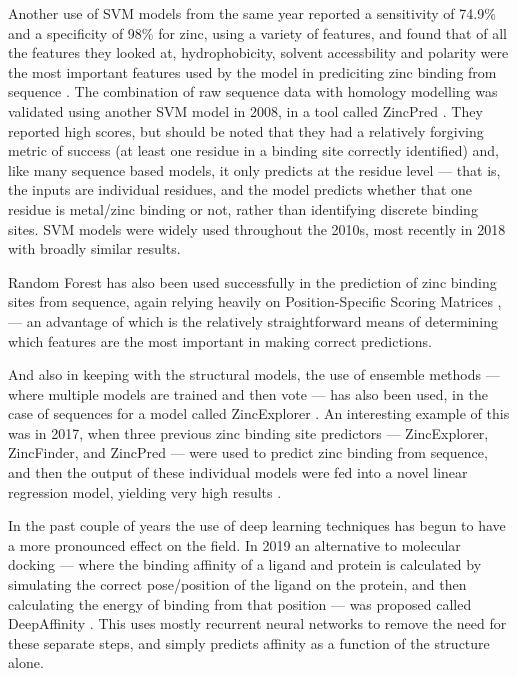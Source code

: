 Another use of SVM models from the same year reported a sensitivity of 74.9\% and a specificity of 98\% for zinc, using a variety of features, and found that of all the features they looked at, hydrophobicity, solvent accessbility and polarity were the most important features used by the model in prediciting zinc binding from sequence \cite{lin2006prediction}. The combination of raw sequence data with homology modelling was validated using another SVM model in 2008, in a tool called ZincPred \cite{shu2008prediction}. They reported high scores, but should be noted that they had a relatively forgiving metric of success (at least one residue in a binding site correctly identified) and, like many sequence based models, it only predicts at the residue level --- that is, the inputs are individual residues, and the model predicts whether that one residue is metal/zinc binding or not, rather than identifying discrete binding sites. SVM models were widely used throughout the 2010s, most recently in 2018 \cite{srivastava2018prediction} with broadly similar results.

Random Forest has also been used successfully in the prediction of zinc binding sites from sequence, again relying heavily on Position-Specific Scoring Matrices \cite{zheng2012}, \cite{Kumar2017} --- an advantage of which is the relatively straightforward means of determining which features are the most important in making correct predictions.

And also in keeping with the structural models, the use of ensemble methods --- where multiple models are trained and then vote --- has also been used, in the case of sequences for a model called ZincExplorer \cite{chen2013}. An interesting example of this was in 2017, when three previous zinc binding site predictors --- ZincExplorer, ZincFinder, and ZincPred --- were used to predict zinc binding from sequence, and then the output of these individual models were fed into a novel linear regression model, yielding very high results \cite{li2017}.

In the past couple of years the use of deep learning techniques has begun to have a more pronounced effect on the field. In 2019 an alternative to molecular docking --- where the binding affinity of a ligand and protein is calculated by simulating the correct pose/position of the ligand on the protein, and then calculating the energy of binding from that position --- was proposed called DeepAffinity \cite{karimi2019}. This uses mostly recurrent neural networks to remove the need for these separate steps, and simply predicts affinity as a function of the structure alone.

